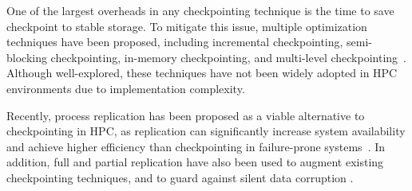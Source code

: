 One of the largest overheads in any checkpointing technique is the time to save checkpoint
to stable storage. %
To mitigate this issue, multiple optimization techniques have been proposed, including incremental checkpointing, semi-blocking checkpointing, in-memory checkpointing, and multi-level checkpointing~\cite{Agarwal:04:Adaptive,plank_ftcs_1994,elnozahy_1992_manetho,zheng2004ftc,ni2012hiding,Moody:10:SCR,hakkarine_2013}.
 Although well-explored, these techniques have not been widely adopted
in HPC environments due to implementation complexity. 

Recently, process replication has been proposed as a viable alternative to checkpointing in HPC, as replication can significantly increase system availability and achieve higher efficiency than checkpointing in failure-prone systems~\cite{riesen_sandia_2010,cappello2009fault}.
In addition, full and partial
replication have also been used to augment existing checkpointing techniques, and to guard
against silent data corruption \cite{elliott_2012_cpr,ni_2013_acr,fiala_2012_sdc}.



